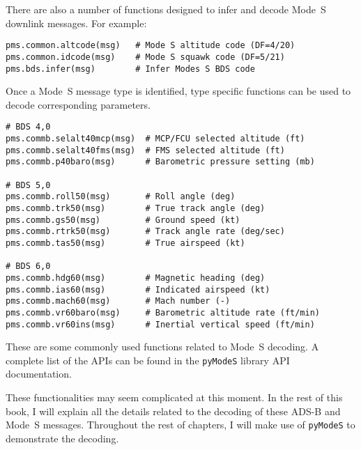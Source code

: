 There are also a number of functions designed to infer and decode Mode~S downlink messages. For example:

\begin{verbatim}
pms.common.altcode(msg)   # Mode S altitude code (DF=4/20)
pms.common.idcode(msg)    # Mode S squawk code (DF=5/21)
pms.bds.infer(msg)        # Infer Modes S BDS code
\end{verbatim}

Once a Mode~S message type is identified, type specific functions can be used to decode corresponding parameters.

\begin{verbatim}
# BDS 4,0
pms.commb.selalt40mcp(msg)  # MCP/FCU selected altitude (ft)
pms.commb.selalt40fms(msg)  # FMS selected altitude (ft)
pms.commb.p40baro(msg)      # Barometric pressure setting (mb)

# BDS 5,0
pms.commb.roll50(msg)       # Roll angle (deg)
pms.commb.trk50(msg)        # True track angle (deg)
pms.commb.gs50(msg)         # Ground speed (kt)
pms.commb.rtrk50(msg)       # Track angle rate (deg/sec)
pms.commb.tas50(msg)        # True airspeed (kt)

# BDS 6,0
pms.commb.hdg60(msg)        # Magnetic heading (deg)
pms.commb.ias60(msg)        # Indicated airspeed (kt)
pms.commb.mach60(msg)       # Mach number (-)
pms.commb.vr60baro(msg)     # Barometric altitude rate (ft/min)
pms.commb.vr60ins(msg)      # Inertial vertical speed (ft/min)
\end{verbatim}

These are some commonly used functions related to Mode~S decoding. A complete list of the APIs can be found in the \texttt{pyModeS} library API documentation. 

These functionalities may seem complicated at this moment. In the rest of this book, I will explain all the details related to the decoding of these ADS-B and Mode~S messages. Throughout the rest of chapters, I will make use of \texttt{pyModeS} to demonstrate the decoding.
